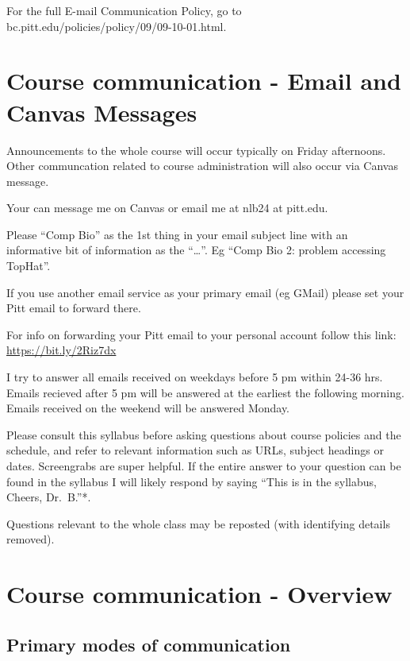 \documentclass[
]{book}
\begin{document}
For the full E-mail Communication Policy, go to bc.pitt.edu/policies/policy/09/09-10-01.html.

\hypertarget{email_and_canvas_msg}{%
\chapter{Course communication - Email and Canvas Messages}\label{email_and_canvas_msg}}

Announcements to the whole course will occur typically on Friday afternoons. Other communcation related to course administration will also occur via Canvas message.

Your can message me on Canvas or email me at nlb24 at pitt.edu.

Please ``Comp Bio'' as the 1st thing in your email subject line with an informative bit of information as the ``\ldots{}''. Eg ``Comp Bio 2: problem accessing TopHat''.

If you use another email service as your primary email (eg GMail) please set your Pitt email to forward there.

For info on forwarding your Pitt email to your personal account follow this link: \url{https://bit.ly/2Riz7dx}

I try to answer all emails received on weekdays before 5 pm within 24-36 hrs. Emails recieved after 5 pm will be answered at the earliest the following morning. Emails received on the weekend will be answered Monday.

Please consult this syllabus before asking questions about course policies and the schedule, and refer to relevant information such as URLs, subject headings or dates. Screengrabs are super helpful. If the entire answer to your question can be found in the syllabus I will likely respond by saying ``This is in the syllabus, Cheers, Dr.~B.''*.

Questions relevant to the whole class may be reposted (with identifying details removed).

\hypertarget{course-communication---overview}{%
\chapter{Course communication - Overview}\label{course-communication---overview}}

\hypertarget{primary-modes-of-communication}{%
\section{Primary modes of communication}\label{primary-modes-of-communication}}
\end{document}
